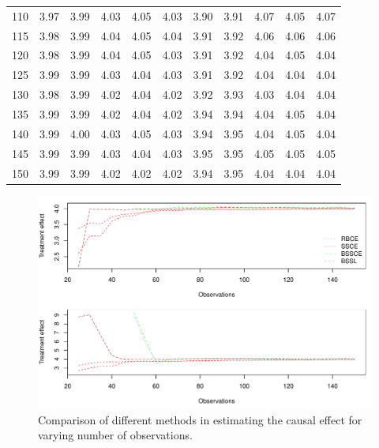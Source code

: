 \documentclass[preprint,12pt]{elsarticle}
\begin{document}
\begin{table}[ht]
\begin{tabular}{c|ccccc|ccccc}
  110 & 3.97 & 3.99 & 4.03 & 4.05 & 4.03 & 3.90 & 3.91 & 4.07 & 4.05 & 4.07 \\ 
  115 & 3.98 & 3.99 & 4.04 & 4.05 & 4.04 & 3.91 & 3.92 & 4.06 & 4.06 & 4.06 \\ 
  120 & 3.98 & 3.99 & 4.04 & 4.05 & 4.03 & 3.91 & 3.92 & 4.04 & 4.05 & 4.04 \\ 
  125 & 3.99 & 3.99 & 4.03 & 4.04 & 4.03 & 3.91 & 3.92 & 4.04 & 4.04 & 4.04 \\ 
  130 & 3.98 & 3.99 & 4.02 & 4.04 & 4.02 & 3.92 & 3.93 & 4.03 & 4.04 & 4.04 \\ 
  135 & 3.99 & 3.99 & 4.02 & 4.04 & 4.02 & 3.94 & 3.94 & 4.04 & 4.05 & 4.04 \\ 
  140 &  3.99 & 4.00 & 4.03 & 4.05 & 4.03 & 3.94 & 3.95 & 4.04 & 4.05 & 4.04 \\ 
  145 & 3.99 & 3.99 & 4.03 & 4.04 & 4.03 & 3.95 & 3.95 & 4.05 & 4.05 & 4.05 \\ 
  150 & 3.99 & 3.99 & 4.02 & 4.02 & 4.02 & 3.94 & 3.95 & 4.04 & 4.04 & 4.04 \\ 
   \hline
\end{tabular}
\label{tab:causal1}
\end{table}
\begin{figure}
    \centering
    \includegraphics[width = 0.9\linewidth]{treat_obs.pdf}
    \caption{Comparison of different methods in estimating the causal effect for varying number of observations.}
    \label{fig:comp:trt}
\end{figure}
\end{document}
